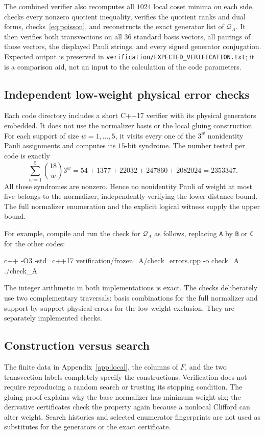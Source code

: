 \documentclass[11pt,a4paper]{article}
\newcommand{\CA}{\mathcal Q_A}
\begin{document}
The combined verifier also recomputes all $1024$ local coset minima on each side, checks every nonzero quotient inequality, verifies the quotient ranks and dual forms, checks~\eqref{eq:poisson}, and reconstructs the exact generator list of $\CA$. It then verifies both transvections on all $36$ standard basis vectors, all pairings of those vectors, the displayed Pauli strings, and every signed generator conjugation. Expected output is preserved in \texttt{verification/EXPECTED\_VERIFICATION.txt}; it is a comparison aid, not an input to the calculation of the code parameters.

\subsection{Independent low-weight physical error checks}
Each code directory includes a short C++17 verifier with its physical generators embedded. It does not use the normalizer basis or the local gluing construction. For each support of size $w=1,\ldots,5$, it visits every one of the $3^w$ nonidentity Pauli assignments and computes its $15$-bit syndrome. The number tested per code is exactly
\begin{equation}
 \sum_{w=1}^{5}\binom{18}{w}3^w
 =54+1377+22032+247860+2082024
 =2353347.
\end{equation}
All these syndromes are nonzero. Hence no nonidentity Pauli of weight at most five belongs to the normalizer, independently verifying the lower distance bound. The full normalizer enumeration and the explicit logical witness supply the upper bound.

For example, compile and run the check for $\CA$ as follows, replacing \texttt{A} by \texttt{B} or \texttt{C} for the other codes:
\begin{center}\small\ttfamily
c++ -O3 -std=c++17 verification/frozen\_A/check\_errors.cpp -o check\_A\\
./check\_A
\end{center}
The integer arithmetic in both implementations is exact. The checks deliberately use two complementary traversals: basis combinations for the full normalizer and support-by-support physical errors for the low-weight exclusion. They are separately implemented checks.

\subsection{Construction versus search}
The finite data in Appendix~\ref{app:local}, the columns of $F$, and the two transvection labels completely specify the constructions. Verification does not require reproducing a random search or trusting its stopping condition. The gluing proof explains why the base normalizer has minimum weight six; the derivative certificates check the property again because a nonlocal Clifford can alter weight. Search histories and selected enumerator fingerprints are not used as substitutes for the generators or the exact certificate.
\end{document}
